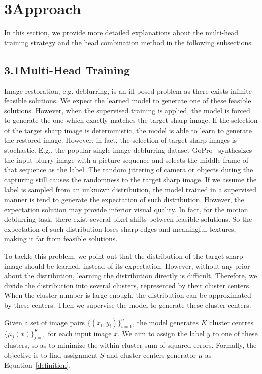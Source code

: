 \documentclass[letterpaper]{article} \usepackage{aaai23}  \usepackage{times}  \usepackage{helvet}  \usepackage{courier}  \usepackage[hyphens]{url}  \usepackage{graphicx} \urlstyle{rm} \def\UrlFont{\rm}  \usepackage{natbib}  \usepackage{caption} \frenchspacing  \setlength{\pdfpagewidth}{8.5in} \setlength{\pdfpageheight}{11in} \usepackage{algorithm}
\begin{document}
\section{3\quad Approach}

In this section, we provide more detailed explanations about the multi-head training strategy and the head combination method in the following subsections. 

\subsection{3.1\quad Multi-Head Training}

Image restoration, e.g. deblurring, is an ill-posed problem as there exists infinite feasible solutions. We expect the learned model to generate one of these feasible solutions. However, when the supervised training is applied, the model is forced to generate the one which exactly matches the target sharp image. If the selection of the target sharp image is deterministic, the model is able to learn to generate the restored image. However, in fact, the selection of target sharp images is stochastic. E.g., the popular single image deblurring dataset GoPro~\cite{Nah_2017_CVPR} synthesizes the input blurry image with a picture sequence and selects the middle frame of that sequence as the label. The random jittering of camera or objects during the capturing still causes the randomness to the target sharp image. If we assume the label is sampled from an unknown distribution, the model trained in a supervised manner is tend to generate the expectation of such distribution. However, the expectation solution may provide inferior visual quality. In fact, for the motion deblurring task, there exist several pixel shifts between feasible solutions. So the expectation of such distribution loses sharp edges and meaningful textures, making it far from feasible solutions.

To tackle this problem, we point out that the distribution of the target sharp image should be learned, instead of its expectation. 
However, without any prior about the distribution, learning the distribution directly is difficult. Therefore, we divide the distribution into several clusters, represented by their cluster centers. When the cluster number is large enough, the distribution can be approximated by these centers. 
Then we supervise the model to generate these cluster centers. 

Given a set of image pairs $ \{ (x_i, y_i)\}_{i=1}^n $, the model generates $K$ cluster centres $\{ \mu_j(x) \}_{j=1}^K$ for each input image $x$. We aim to assign the label $y$ to one of these clusters, so as to minimize the within-cluster sum of squared errors. Formally, the objective is to find assignment $S$ and cluster centers generator $\mu$ as Equation~\ref{definition}.
\end{document}
